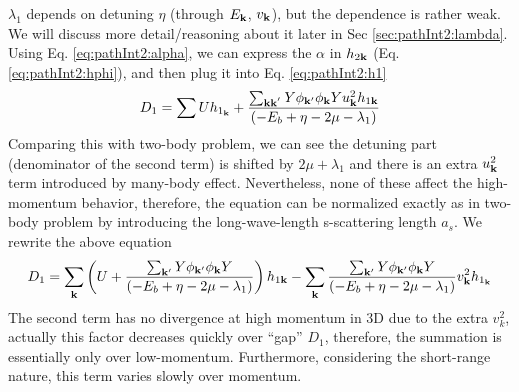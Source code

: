 $\lambda_{1}$ depends on detuning $\eta$ (through $E_{\mathbf{k}}$, $v_{\mathbf{k}}$), but the dependence is rather weak. We will discuss more detail/reasoning about it later in Sec \ref{sec:pathInt2:lambda}. 
Using Eq. \ref{eq:pathInt2:alpha}, we can express the $\alpha$ in $h_{2\mathbf{k}}$ (Eq. \ref{eq:pathInt2:hphi}), and then plug it into Eq. \ref{eq:pathInt2:h1}
\begin{equation*}
D_{1}=\sum{}U{h_{1_{\mathbf{k}}}}+\frac{\sum_{\mathbf{k}\mathbf{k}^{'}} Y{\phi_{\mathbf{k}'}}{\phi_{\mathbf{k}}}{Y}u_{\mathbf{k}}^{2}{{h_{1\mathbf{k}}}}}{\left(-E_{b}+\eta-2\mu-\lambda_{1}\right)}\end{equation*}
Comparing this with two-body problem, we can see the detuning part (denominator of the second term) is shifted by $2\mu+\lambda_{1}$ and there is an extra $u_{\mathbf{k}}^{2}$ term introduced by many-body effect.  Nevertheless, none of these affect the high-momentum behavior, therefore, the equation can be normalized exactly as in two-body problem by introducing the long-wave-length s-scattering length $a_{s}$.  We rewrite the above equation
\begin{equation*}
D_{1}=\sum_{\mathbf{k}}\left(U+\frac{\sum_{\mathbf{k}'}Y{\phi_{\mathbf{k}'}}{\phi_{\mathbf{k}}}{Y}}{\left(-E_{b}+\eta-2\mu-\lambda_{1}\right)}\right){{h_{1\mathbf{k}}}}
	-\sum_{\mathbf{k}}\frac{\sum_{\mathbf{k}'}Y{\phi_{\mathbf{k}'}}{\phi_{\mathbf{k}}}{Y}}{\left(-E_{b}+\eta-2\mu-\lambda_{1}\right)}v_{\mathbf{k}}^{2}{{h_{1_{\mathbf{k}}}}}
\end{equation*}
The second term has no divergence at high momentum in 3D due to the extra $v_{k}^{2}$, actually this factor decreases quickly over ``gap'' $D_{1}$, therefore, the summation is essentially only over low-momentum.   Furthermore, considering the short-range nature, this term varies slowly over momentum.  

